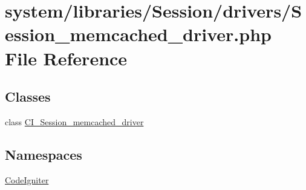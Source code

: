 \hypertarget{_session__memcached__driver_8php}{}\section{system/libraries/\+Session/drivers/\+Session\+\_\+memcached\+\_\+driver.php File Reference}
\label{_session__memcached__driver_8php}
\subsection*{Classes}
\begin{DoxyCompactItemize}
\item 
class \mbox{\hyperlink{class_c_i___session__memcached__driver}{C\+I\+\_\+\+Session\+\_\+memcached\+\_\+driver}}
\end{DoxyCompactItemize}
\subsection*{Namespaces}
\begin{DoxyCompactItemize}
\item 
 \mbox{\hyperlink{namespace_code_igniter}{Code\+Igniter}}
\end{DoxyCompactItemize}
